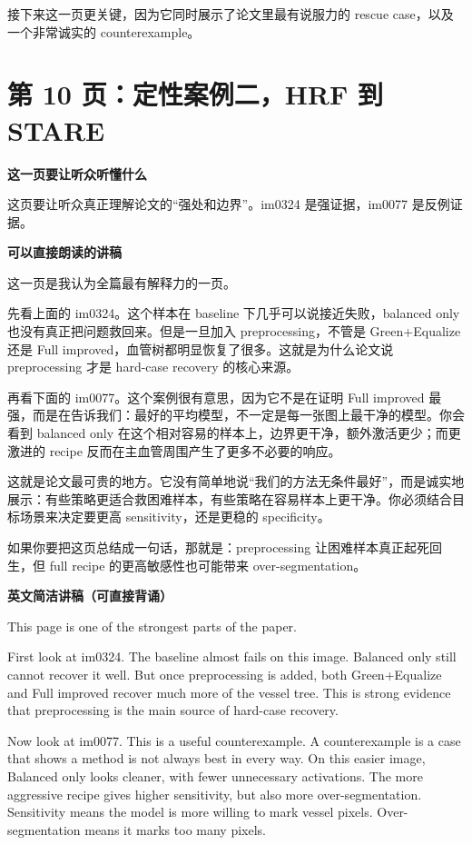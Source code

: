 \documentclass[12pt,a4paper]{ctexart}
\newcommand{\EnglishScriptHeading}{\textbf{\color{AccentGreen}英文简洁讲稿（可直接背诵）}}
\begin{document}
接下来这一页更关键，因为它同时展示了论文里最有说服力的 rescue case，以及一个非常诚实的 counterexample。

\section*{第 10 页：定性案例二，HRF 到 STARE}

\textbf{这一页要让听众听懂什么}

这页要让听众真正理解论文的“强处和边界”。im0324 是强证据，im0077 是反例证据。

\textbf{可以直接朗读的讲稿}

这一页是我认为全篇最有解释力的一页。

先看上面的 im0324。这个样本在 baseline 下几乎可以说接近失败，balanced only 也没有真正把问题救回来。但是一旦加入 preprocessing，不管是 Green+Equalize 还是 Full improved，血管树都明显恢复了很多。这就是为什么论文说 preprocessing 才是 hard-case recovery 的核心来源。

再看下面的 im0077。这个案例很有意思，因为它不是在证明 Full improved 最强，而是在告诉我们：最好的平均模型，不一定是每一张图上最干净的模型。你会看到 balanced only 在这个相对容易的样本上，边界更干净，额外激活更少；而更激进的 recipe 反而在主血管周围产生了更多不必要的响应。

这就是论文最可贵的地方。它没有简单地说“我们的方法无条件最好”，而是诚实地展示：有些策略更适合救困难样本，有些策略在容易样本上更干净。你必须结合目标场景来决定要更高 sensitivity，还是更稳的 specificity。

如果你要把这页总结成一句话，那就是：preprocessing 让困难样本真正起死回生，但 full recipe 的更高敏感性也可能带来 over-segmentation。

\EnglishScriptHeading

This page is one of the strongest parts of the paper.

First look at im0324. The baseline almost fails on this image. Balanced only still cannot recover it well. But once preprocessing is added, both Green+Equalize and Full improved recover much more of the vessel tree. This is strong evidence that preprocessing is the main source of hard-case recovery.

Now look at im0077. This is a useful counterexample. A counterexample is a case that shows a method is not always best in every way. On this easier image, Balanced only looks cleaner, with fewer unnecessary activations. The more aggressive recipe gives higher sensitivity, but also more over-segmentation. Sensitivity means the model is more willing to mark vessel pixels. Over-segmentation means it marks too many pixels.
\end{document}

